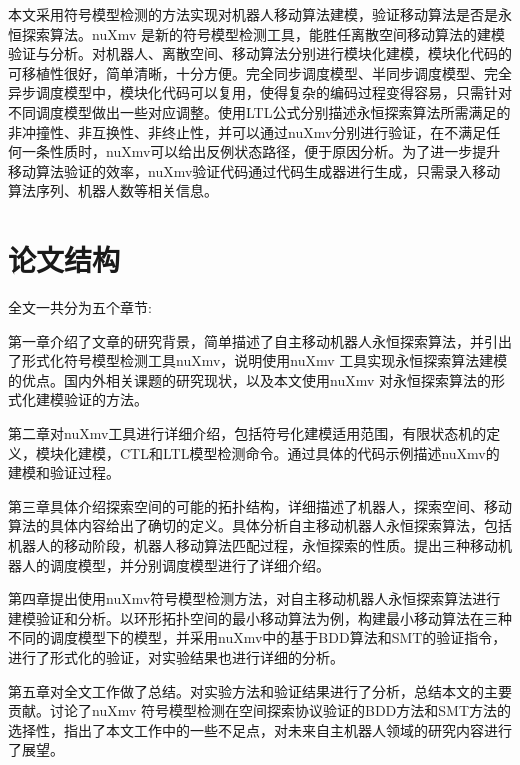 本文采用符号模型检测的方法实现对机器人移动算法建模，验证移动算法是否是永恒探索算法。nuXmv 是新的符号模型检测工具，能胜任离散空间移动算法的建模验证与分析。对机器人、离散空间、移动算法分别进行模块化建模，模块化代码的可移植性很好，简单清晰，十分方便。完全同步调度模型、半同步调度模型、完全异步调度模型中，模块化代码可以复用，使得复杂的编码过程变得容易，只需针对不同调度模型做出一些对应调整。使用LTL公式分别描述永恒探索算法所需满足的非冲撞性、非互换性、非终止性，并可以通过nuXmv分别进行验证，在不满足任何一条性质时，nuXmv可以给出反例状态路径，便于原因分析。为了进一步提升移动算法验证的效率，nuXmv验证代码通过代码生成器进行生成，只需录入移动算法序列、机器人数等相关信息。

\section{论文结构}
全文一共分为五个章节:

第一章介绍了文章的研究背景，简单描述了自主移动机器人永恒探索算法，并引出了形式化符号模型检测工具nuXmv，说明使用nuXmv 工具实现永恒探索算法建模的优点。国内外相关课题的研究现状，以及本文使用nuXmv 对永恒探索算法的形式化建模验证的方法。

第二章对nuXmv工具进行详细介绍，包括符号化建模适用范围，有限状态机的定义，模块化建模，CTL和LTL模型检测命令。通过具体的代码示例描述nuXmv的建模和验证过程。

第三章具体介绍探索空间的可能的拓扑结构，详细描述了机器人，探索空间、移动算法的具体内容给出了确切的定义。具体分析自主移动机器人永恒探索算法，包括机器人的移动阶段，机器人移动算法匹配过程，永恒探索的性质。提出三种移动机器人的调度模型，并分别调度模型进行了详细介绍。

第四章提出使用nuXmv符号模型检测方法，对自主移动机器人永恒探索算法进行建模验证和分析。以环形拓扑空间的最小移动算法为例，构建最小移动算法在三种不同的调度模型下的模型，并采用nuXmv中的基于BDD算法和SMT的验证指令，进行了形式化的验证，对实验结果也进行详细的分析。

第五章对全文工作做了总结。对实验方法和验证结果进行了分析，总结本文的主要贡献。讨论了nuXmv 符号模型检测在空间探索协议验证的BDD方法和SMT方法的选择性，指出了本文工作中的一些不足点，对未来自主机器人领域的研究内容进行了展望。

